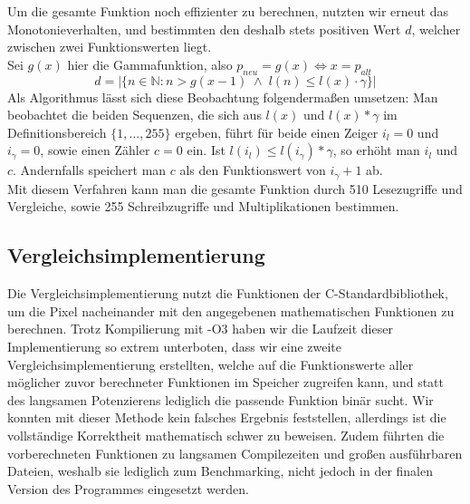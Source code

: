 \documentclass[course=erap]{aspdoc}
\begin{document}
	\noindent
	Um die gesamte Funktion noch effizienter zu berechnen, nutzten wir erneut das Monotonieverhalten, und bestimmten den deshalb stets positiven Wert $d$, welcher zwischen zwei Funktionswerten liegt.\\
	Sei $g(x)$ hier die Gammafunktion, also $p_{neu}=g(x) \iff x = p_{alt}$
	\begin{equation}
	    d= |\{n\in \mathbb{N} : n>g(x-1) \;\wedge\; l(n)\leq l(x)\cdot \gamma\}|
	\end{equation}
	Als Algorithmus lässt sich diese Beobachtung folgendermaßen umsetzen: Man beobachtet die beiden Sequenzen, die sich aus $l(x)$ und $l(x)*\gamma$ im Definitionsbereich $\{1,...,255\}$ ergeben, führt für beide einen Zeiger $i_{l} = 0$ und $i_{\gamma} = 0$, sowie einen Zähler $c = 0$ ein.
	Ist $l(i_{l})\leq l(i_{\gamma})*\gamma$, so erhöht man $i_{l}$ und $c$. Andernfalls speichert man $c$ als den Funktionswert von $i_{\gamma}+1$ ab.\\
	Mit diesem Verfahren kann man die gesamte Funktion durch 510 Lesezugriffe und Vergleiche, sowie 255 Schreibzugriffe und Multiplikationen bestimmen.

	\subsection{Vergleichsimplementierung}
	Die Vergleichsimplementierung nutzt die Funktionen der C-Standardbibliothek, um die Pixel nacheinander mit den angegebenen mathematischen Funktionen zu berechnen. Trotz Kompilierung mit -O3 haben wir die Laufzeit dieser Implementierung so extrem unterboten, dass wir eine zweite Vergleichsimplementierung erstellten, welche auf die Funktionswerte aller möglicher zuvor berechneter Funktionen im Speicher zugreifen kann, und statt des langsamen Potenzierens lediglich die passende Funktion binär sucht. Wir konnten mit dieser Methode kein falsches Ergebnis feststellen, allerdings ist die vollständige Korrektheit mathematisch schwer zu beweisen.
	Zudem führten die vorberechneten Funktionen  zu langsamen Compilezeiten und großen ausführbaren Dateien, weshalb sie lediglich zum Benchmarking, nicht jedoch in der finalen Version des Programmes eingesetzt werden.
\end{document}
